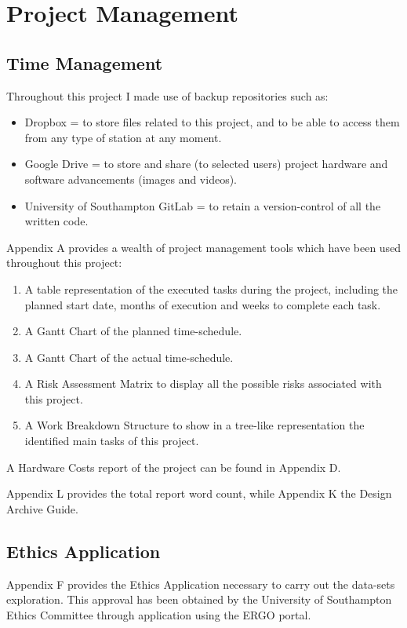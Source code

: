 \chapter{Project Management}

\label{ch:management}
\setlength\lineskip{0pt}
\vspace*{15pt}

\section{Time Management}
Throughout this project I made use of backup repositories such as:

\begin{itemize}
\itemsep0em
\item Dropbox = to store files related to this project, and to be able to access them from any type of station at any moment.
\item Google Drive = to store and share (to selected users) project hardware and software advancements (images and videos).
\item University of Southampton GitLab = to retain a version-control of all the written code.
\end{itemize}

Appendix A provides a wealth of project management tools which have been used throughout this project:

\begin{enumerate}
\itemsep0em
\item A table representation of the executed tasks during the project, including the planned start date, months of execution and weeks to complete each task. 
\item A Gantt Chart of the planned time-schedule.
\item A Gantt Chart of the actual time-schedule.
\item A Risk Assessment Matrix to display all the possible risks associated with this project.
\item A Work Breakdown Structure to show in a tree-like representation the identified main tasks of this project. 
\end{enumerate}

A Hardware Costs report of the project can be found in Appendix D.

Appendix L provides the total report word count, while Appendix K the Design Archive Guide.

\section{Ethics Application}
Appendix F provides the Ethics Application necessary to carry out the data-sets exploration. This approval has been obtained by the University of Southampton Ethics Committee through application using the ERGO  portal.

